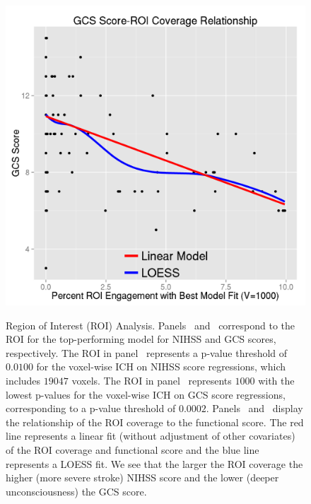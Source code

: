 \documentclass[10pt]{article}\usepackage[]{graphicx}\usepackage[]{color}
\begin{document}
\begin{figure}[H]
{ \label{pvals:reggcs}
 \includegraphics[width=.48\textwidth]{Regress_ROI_GCS_Best_Model.png}
 } 
 \newline 
  
  \caption{Region of Interest (ROI) Analysis.  Panels~\protect{} and~\protect{} correspond to the ROI for the top-performing model for NIHSS and GCS scores, respectively.  The ROI in panel~\protect{} represents a p-value threshold of $0.0100$ for the voxel-wise ICH on NIHSS score regressions, which includes $19047$ voxels. The ROI in panel~\protect{} represents $1000$ with the lowest p-values for the voxel-wise ICH on GCS score regressions, corresponding to a p-value threshold of $0.0002$.
    Panels~\protect{} and~\protect{} display the relationship of the ROI coverage to the functional score.  The red line represents a linear fit (without adjustment of other covariates) of the ROI coverage and functional score and the blue line represents a LOESS fit.  We see that the larger the ROI coverage the higher (more severe stroke) NIHSS score and the lower (deeper unconsciousness) the GCS score.  
}
  \label{f:roi}
\end{figure}





  
\end{document}
